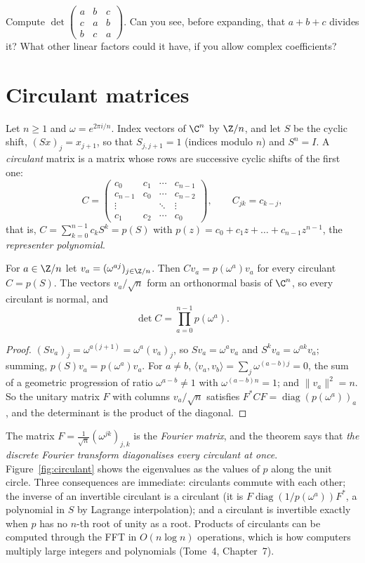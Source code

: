 \begin{think}
Compute $\det\begin{pmatrix}a&b&c\\c&a&b\\b&c&a\end{pmatrix}$. Can you see, before expanding, that $a+b+c$ divides it? What
other linear factors could it have, if you allow complex coefficients?
\end{think}

\section{Circulant matrices}

Let $n\ge1$ and $\omega=e^{2\pi i/n}$. Index vectors of $\C^n$ by $\Z/n$, and let $S$ be the cyclic shift, $(Sx)_j=x_{j+1}$, so
that $S_{j,j+1}=1$ (indices modulo $n$) and $S^n=I$. A \emph{circulant} matrix is a matrix whose rows are successive cyclic shifts
of the first one:
\[
C=\begin{pmatrix}c_0&c_1&\cdots&c_{n-1}\\c_{n-1}&c_0&\cdots&c_{n-2}\\\vdots&&\ddots&\vdots\\c_1&c_2&\cdots&c_0\end{pmatrix},
\qquad C_{jk}=c_{k-j},
\]
that is, $C=\sum_{k=0}^{n-1}c_kS^k=p(S)$ with $p(z)=c_0+c_1z+\dots+c_{n-1}z^{n-1}$, the \emph{representer polynomial}.

\begin{theorem}\label{thm:circulant}
For $a\in\Z/n$ let $v_a=(\omega^{aj})_{j\in\Z/n}$. Then $Cv_a=p(\omega^a)v_a$ for every circulant $C=p(S)$. The vectors
$v_a/\sqrt n$ form an orthonormal basis of $\C^n$, so every circulant is normal, and
\[
\det C=\prod_{a=0}^{n-1}p(\omega^a).
\]
\end{theorem}
\begin{proof}
$(Sv_a)_j=\omega^{a(j+1)}=\omega^a(v_a)_j$, so $Sv_a=\omega^av_a$ and $S^kv_a=\omega^{ak}v_a$; summing, $p(S)v_a=p(\omega^a)v_a$.
For $a\ne b$, $\langle v_a,v_b\rangle=\sum_j\omega^{(a-b)j}=0$, the sum of a geometric progression of ratio $\omega^{a-b}\ne1$
with $\omega^{(a-b)n}=1$; and $\|v_a\|^2=n$. So the unitary matrix $F$ with columns $v_a/\sqrt n$ satisfies $F^*CF=\operatorname
{diag}(p(\omega^a))_a$, and the determinant is the product of the diagonal.
\end{proof}

The matrix $F=\frac1{\sqrt n}(\omega^{jk})_{j,k}$ is the \emph{Fourier matrix}, and the theorem says that \emph{the discrete Fourier
transform diagonalises every circulant at once}. Figure~\ref{fig:circulant} shows the eigenvalues as the values of $p$ along the
unit circle. Three consequences are immediate: circulants commute with each other; the inverse of an invertible circulant is a
circulant (it is $F\operatorname{diag}(1/p(\omega^a))F^*$, a polynomial in $S$ by Lagrange interpolation); and a circulant is
invertible exactly when $p$ has no $n$-th root of unity as a root. Products of circulants can be computed through the FFT in
$O(n\log n)$ operations, which is how computers multiply large integers and polynomials (Tome~4, Chapter~7).

